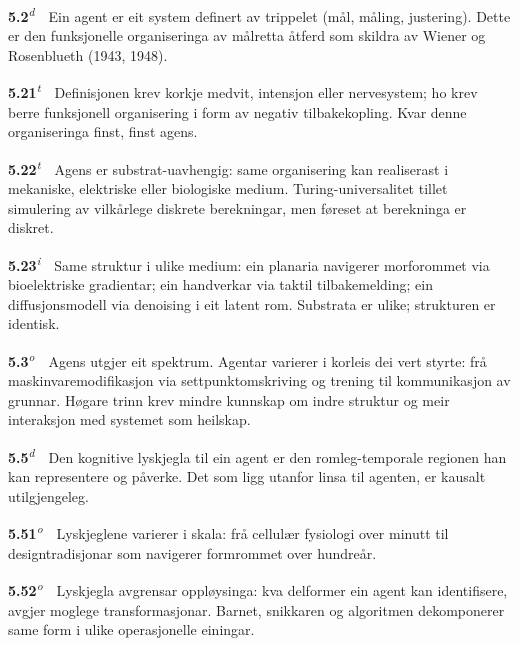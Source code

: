 \documentclass[10pt]{article}
\begin{document}
\noindent\textbf{5.2}\textsuperscript{\textit{d}}~~Ein agent er eit system definert av trippelet (mål, måling, justering). Dette er den funksjonelle organiseringa av målretta åtferd som skildra av Wiener og Rosenblueth (1943, 1948).




\noindent\textbf{5.21}\textsuperscript{\textit{t}}~~Definisjonen krev korkje medvit, intensjon eller nervesystem; ho krev berre funksjonell organisering i form av negativ tilbakekopling. Kvar denne organiseringa finst, finst agens.




\noindent\textbf{5.22}\textsuperscript{\textit{t}}~~Agens er substrat-uavhengig: same organisering kan realiserast i mekaniske, elektriske eller biologiske medium. Turing-universalitet tillet simulering av vilkårlege diskrete berekningar, men føreset at berekninga er diskret.




\noindent\textbf{5.23}\textsuperscript{\textit{i}}~~Same struktur i ulike medium: ein planaria navigerer morforommet via bioelektriske gradientar; ein handverkar via taktil tilbakemelding; ein diffusjonsmodell via denoising i eit latent rom. Substrata er ulike; strukturen er identisk.




\noindent\textbf{5.3}\textsuperscript{\textit{o}}~~Agens utgjer eit spektrum. Agentar varierer i korleis dei vert styrte: frå maskinvaremodifikasjon via settpunktomskriving og trening til kommunikasjon av grunnar. Høgare trinn krev mindre kunnskap om indre struktur og meir interaksjon med systemet som heilskap.




\noindent\textbf{5.5}\textsuperscript{\textit{d}}~~Den kognitive lyskjegla til ein agent er den romleg-temporale regionen han kan representere og påverke. Det som ligg utanfor linsa til agenten, er kausalt utilgjengeleg.




\noindent\textbf{5.51}\textsuperscript{\textit{o}}~~Lyskjeglene varierer i skala: frå cellulær fysiologi over minutt til designtradisjonar som navigerer formrommet over hundreår.




\noindent\textbf{5.52}\textsuperscript{\textit{o}}~~Lyskjegla avgrensar oppløysinga: kva delformer ein agent kan identifisere, avgjer moglege transformasjonar. Barnet, snikkaren og algoritmen dekomponerer same form i ulike operasjonelle einingar.
\end{document}
